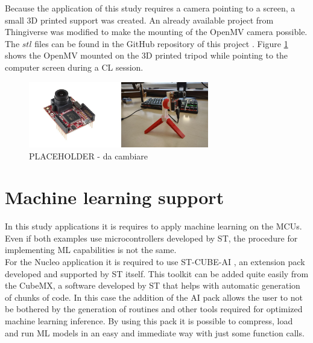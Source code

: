 \documentclass[12pt]{report}
\begin{document}
Because the application of this study requires a camera pointing to a screen, a small 3D printed support was created. An already available project from Thingiverse \autocite{tripod_link} was modified to make the mounting of the OpenMV camera possible. The $stl$ files can be found in the GitHub repository of this project \autocite{github_repo}. Figure \ref{fig:hardware_openmv} shows the OpenMV mounted on the 3D printed tripod while pointing to the computer screen during a CL session.\\

\begin{figure}[h!]
    \centering
    \includegraphics[width=0.7\textwidth]{Figures/Chapter2/hardware_openmv.jpg} 
    \caption{PLACEHOLDER - da cambiare}
    \label{fig:hardware_openmv}    
\end{figure}

\section{Machine learning support}
In this study applications it is requires to apply machine learning on the MCUs. Even if both examples use microcontrollers developed by ST, the procedure for implementing ML capabilities is not the same. \\
For the Nucleo application it is required to use ST-CUBE-AI \autocite{stm_cube_ai}, an extension pack developed and supported by ST itself. This toolkit can be added quite easily from the CubeMX, a software developed by ST that helps with automatic generation of chunks of code. In this case the addition of the AI pack allows the user to not be bothered by the generation of routines and other tools required for optimized machine learning inference. By using this pack it is possible to compress, load and run ML models in an easy and immediate way with just some function calls.
\end{document}
